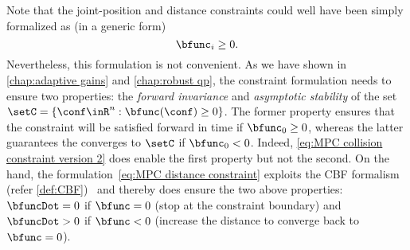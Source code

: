 Note that the joint-position and distance constraints could well have been simply formalized as (in a generic form)
\begin{equation}\label{eq:MPC collision constraint version 2}
	\bfunc_{i} \geq 0.
\end{equation} %
Nevertheless, this formulation is not convenient. As we have shown in \cref{chap:adaptive gains} and \cref{chap:robust qp}, the constraint formulation needs to ensure two properties: the \emph{forward invariance} and \emph{asymptotic stability} of the set $\setC=\left\{\conf\inR^{n}:\bfunc(\conf)\geq0\right\}$. The former property ensures that the constraint will be satisfied forward in time if $\bfunc_{0}\geq0$, whereas the latter guarantees the converges to $\setC$ if $\bfunc_{0}<0$.  Indeed,  \cref{eq:MPC collision constraint version 2} does enable the first property but not the second. 
On the hand, the formulation~\cref{eq:MPC distance constraint} exploits the CBF formalism (refer \cref{def:CBF})~\cite{ames2019ecc} and thereby does ensure the two above properties: $\bfuncDot=0$ if $\bfunc=0$ (stop at the constraint boundary) and $\bfuncDot>0$ if $\bfunc<0$ (increase the distance to converge back to $\bfunc=0$). 

